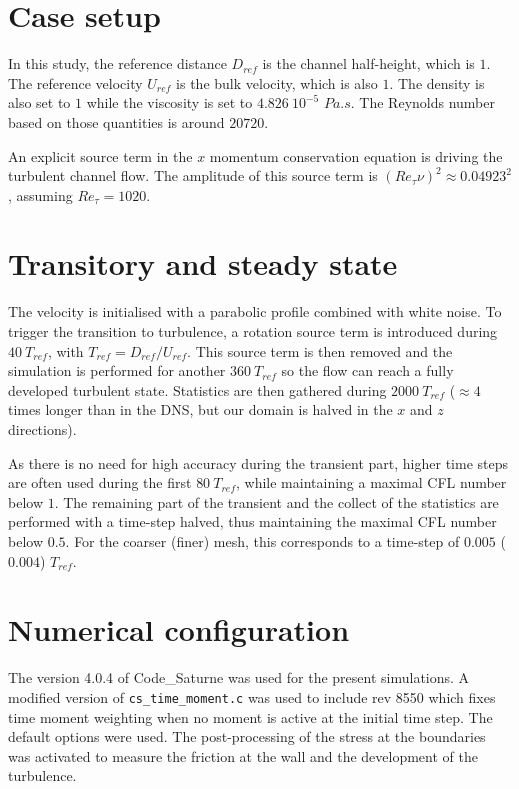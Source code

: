 \documentclass[a4paper]{article}
\newcommand{\CS}{%
   {\fontfamily{ppl}\fontshape{it}\selectfont Code\_Saturne}\xspace}
\begin{document}
\section{Case setup}
In this study, the reference distance $D_{ref}$ is the channel half-height, which is $1$. The reference velocity $U_{ref}$ is the bulk velocity, which is also $1$. The density is also set to $1$ while the viscosity is set to $4.826~10^{-5}$ $Pa.s$. The Reynolds number based on those quantities is around $20720$.

An explicit source term in the $x$ momentum conservation equation is driving the turbulent channel flow. The amplitude of this source term is $\left( Re_\tau \nu \right)^2 \approx 0.04923^2$, assuming $Re_\tau = 1020$.

\section{Transitory and steady state}
The velocity is initialised with a parabolic profile combined with white noise. To trigger the transition to turbulence, a rotation source term is introduced during $40~T_{ref}$, with $T_{ref} = D_{ref} / U_{ref}$. This source term is then removed and the simulation is performed for another $360~T_{ref}$ so the flow can reach a fully developed turbulent state. Statistics are then gathered during $2000~T_{ref}$ ($\approx 4$ times longer than in the DNS, but our domain is halved in the $x$ and $z$ directions).

As there is no need for high accuracy during the transient part, higher time steps are often used during the first $80~T_{ref}$, while maintaining a maximal CFL number below $1$. The remaining part of the transient and the collect of the statistics are performed with a time-step halved, thus maintaining the maximal CFL number below $0.5$. For the coarser (finer) mesh, this corresponds to a time-step of $0.005$ ($0.004$) $T_{ref}$.

\section{Numerical configuration}
The version 4.0.4 of \CS was used for the present simulations. A modified version of \verb!cs_time_moment.c! was used to include rev 8550 which fixes time moment weighting when no moment is active at the initial time step. The default options were used. The post-processing of the stress at the boundaries was activated to measure the friction at the wall and the development of the turbulence.
\end{document}
